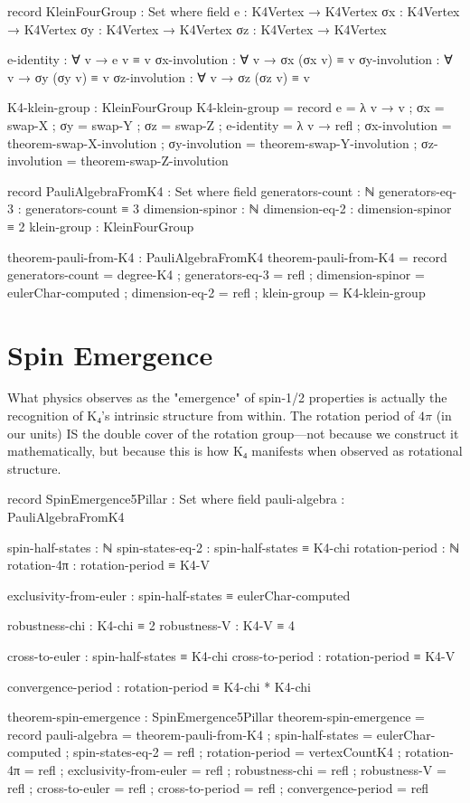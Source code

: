\documentclass[11pt,a4paper]{book}
\begin{document}
\begin{code}
record KleinFourGroup : Set where
  field
    e  : K4Vertex → K4Vertex
    σx : K4Vertex → K4Vertex
    σy : K4Vertex → K4Vertex
    σz : K4Vertex → K4Vertex
    
    e-identity : ∀ v → e v ≡ v
    σx-involution : ∀ v → σx (σx v) ≡ v
    σy-involution : ∀ v → σy (σy v) ≡ v
    σz-involution : ∀ v → σz (σz v) ≡ v

K4-klein-group : KleinFourGroup
K4-klein-group = record
  { e  = λ v → v
  ; σx = swap-X
  ; σy = swap-Y
  ; σz = swap-Z
  ; e-identity = λ v → refl
  ; σx-involution = theorem-swap-X-involution
  ; σy-involution = theorem-swap-Y-involution
  ; σz-involution = theorem-swap-Z-involution
  }

record PauliAlgebraFromK4 : Set where
  field
    generators-count : ℕ
    generators-eq-3  : generators-count ≡ 3
    dimension-spinor : ℕ
    dimension-eq-2   : dimension-spinor ≡ 2
    klein-group      : KleinFourGroup

theorem-pauli-from-K4 : PauliAlgebraFromK4
theorem-pauli-from-K4 = record
  { generators-count = degree-K4
  ; generators-eq-3  = refl
  ; dimension-spinor = eulerChar-computed
  ; dimension-eq-2   = refl
  ; klein-group      = K4-klein-group
  }
\end{code}

\section{Spin Emergence}

What physics observes as the "emergence" of spin-1/2 properties is actually the recognition of K₄'s intrinsic structure from within. The rotation period of $4\pi$ (in our units) IS the double cover of the rotation group—not because we construct it mathematically, but because this is how K₄ manifests when observed as rotational structure.

\begin{code}
record SpinEmergence5Pillar : Set where
  field
    pauli-algebra    : PauliAlgebraFromK4
    
    spin-half-states : ℕ
    spin-states-eq-2 : spin-half-states ≡ K4-chi
    rotation-period  : ℕ
    rotation-4π      : rotation-period ≡ K4-V
    
    exclusivity-from-euler : spin-half-states ≡ eulerChar-computed
    
    robustness-chi : K4-chi ≡ 2
    robustness-V : K4-V ≡ 4
    
    cross-to-euler : spin-half-states ≡ K4-chi
    cross-to-period : rotation-period ≡ K4-V
    
    convergence-period : rotation-period ≡ K4-chi * K4-chi

theorem-spin-emergence : SpinEmergence5Pillar
theorem-spin-emergence = record
  { pauli-algebra    = theorem-pauli-from-K4
  ; spin-half-states = eulerChar-computed
  ; spin-states-eq-2 = refl
  ; rotation-period  = vertexCountK4
  ; rotation-4π      = refl
  ; exclusivity-from-euler = refl
  ; robustness-chi = refl
  ; robustness-V = refl
  ; cross-to-euler = refl
  ; cross-to-period = refl
  ; convergence-period = refl
  }
\end{code}
\end{document}
